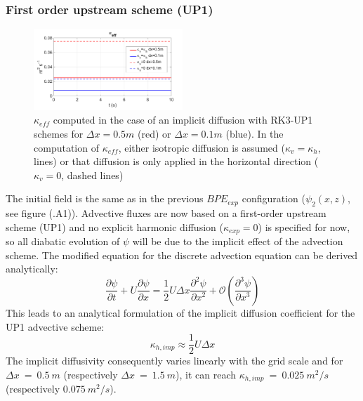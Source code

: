 \subsubsection{First order upstream scheme (UP1)}
\begin{figure}[h!]
\centering
\includegraphics[width=0.5\textwidth]{./CHAP_BPE/AGBPE_numlab3.png}
\caption[Evaluation of $\kappa_{eff}$ for configuration $BPE_{imp}$ with RK3-UP1 schemes]{$\kappa_{eff}$ computed in the case of an implicit diffusion with RK3-UP1 schemes for $\Delta x=0.5m$ (red) or $\Delta x=0.1m$ (blue). In the computation of $\kappa_{eff}$, either isotropic diffusion is assumed ($\kappa_v=\kappa_h$, lines) or that diffusion is only applied in the horizontal direction ($\kappa_v=0$, dashed lines)}
\label{fig3numlab}
\end{figure}
The initial field is the same as in the previous $BPE_{exp}$ configuration ($\psi_2(x,z)$, see figure (.A1)). Advective fluxes are now based on a first-order upstream scheme (UP1) and no explicit harmonic diffusion ($\kappa_{exp}=0$) is specified for now, so all diabatic evolution of $\psi$ will be due to the implicit effect of the advection scheme.
The modified equation for the discrete advection equation can be derived analytically:
\begin{equation}
\frac{\partial \psi}{\partial t}+U \frac{\partial \psi}{\partial x} = \frac{1}{2} U \Delta x  \frac{\partial^2 \psi}{\partial x^2} + \mathcal{O}(\frac{\partial^3 \psi}{\partial x^3})
\end{equation}
This leads to an analytical formulation of the implicit diffusion coefficient for the UP1 advective scheme: 
\begin{equation}
    \displaystyle
    \kappa_{h,imp}\approx\frac{1}{2}U \Delta x
\end{equation}
The implicit diffusivity consequently varies linearly with the grid scale and for $\Delta x\ =\ 0.5\ m$ (respectively $\Delta x\ =\ 1.5\ m$), it can reach $\kappa_{h,imp}\ =\ 0.025\ m^2/s$  (respectively $0.075\ m^2/s$).

